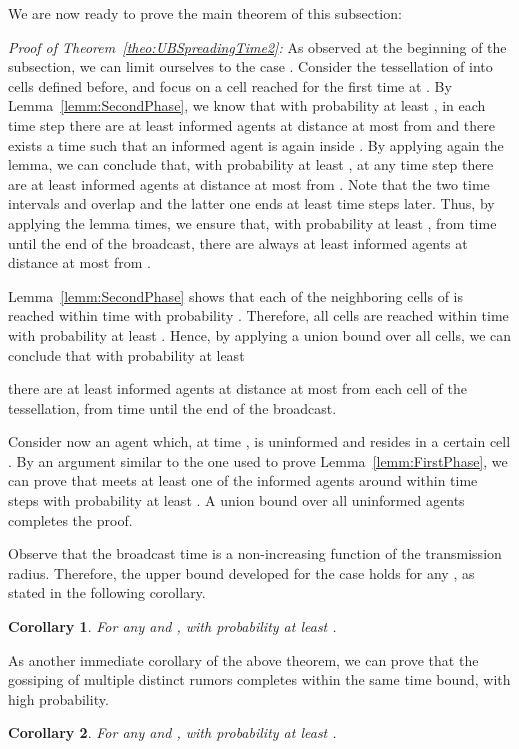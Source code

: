 \documentclass[11pt]{article}
\newtheorem{coro}{Corollary}
\newenvironment{proofof}[1]{\begin{trivlist} 
                         \item[] {\it Proof of #1:}}{\hfill 
                       \end{trivlist}}
\begin{document}
We are now ready to prove the main theorem of this subsection:
\begin{proofof}{Theorem~\ref{theo:UBSpreadingTime2}}
As observed at the beginning of the subsection, we can limit ourselves
to the case .  Consider the tessellation of
 into  cells defined before, and
focus on a cell  reached for the first time at .
By Lemma~\ref{lemm:SecondPhase}, we know that with probability at
least , in each time step 
there are at least  informed agents at distance at
most  from 
and there exists a time  such that an informed agent
is again inside .
By applying again the lemma, we can conclude that, with probability at
least , at any time step  there are at least  informed agents at
distance at most  from .  Note that the
two time intervals  and  overlap and the latter one ends at least
 time steps later.  Thus, by applying the lemma 
times, we ensure that, with probability at least 
, 
from time  until the end of the broadcast, there
are always at least  informed agents at distance at
most  from .

Lemma~\ref{lemm:SecondPhase} shows that each of the neighboring cells
of  is reached within time  with
probability . Therefore, all cells are reached within time
 with probability at least .
Hence, by applying a union bound over all cells,
we can conclude that with probability at least 

there are at least  informed agents at
distance at most  from each cell of the tessellation,
from time  until the end of the broadcast.

Consider now an agent  which, at time , is uninformed and resides in
a certain cell .  By an argument similar to the one used to prove
Lemma~\ref{lemm:FirstPhase}, we can prove that  meets at least one
of the informed agents around  within  time
steps with probability at least . A union bound over all
uninformed agents completes the proof.
\end{proofof}

Observe that the broadcast time is a non-increasing function of the
transmission radius.  Therefore, the upper bound developed for the
case  holds for any , as stated in the following corollary.
\begin{coro}
\label{coro:monotone}
For any  and , 
with probability at least .
\end{coro}

As another immediate corollary of the above theorem, we can prove that
the gossiping of multiple distinct rumors completes within the same
time bound, with high probability.
\begin{coro}
For any  and , 
with probability at least .
\end{coro}
\end{document}
